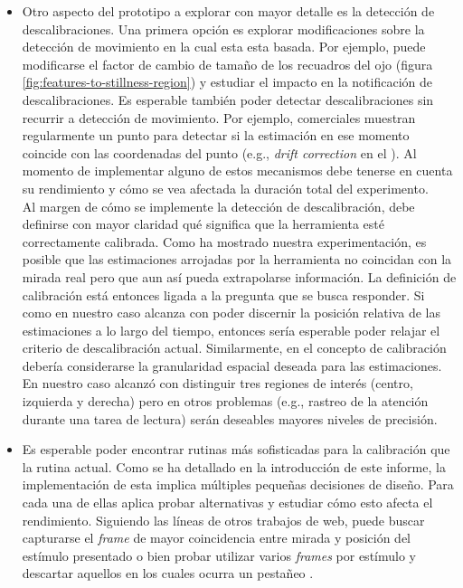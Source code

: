 \begin{itemize}
  \item
    Otro aspecto del prototipo a explorar con mayor detalle es la
    detección de descalibraciones.
    Una primera opción es explorar modificaciones sobre la detección de
    movimiento en la cual esta esta basada.
    Por ejemplo, puede modificarse el factor de cambio de tamaño de los
    recuadros del ojo (figura \ref{fig:features-to-stillness-region}) y
    estudiar el impacto en la notificación de descalibraciones.
    Es esperable también poder detectar descalibraciones sin recurrir a
    detección de movimiento.
    Por ejemplo, \eyetrackers comerciales muestran regularmente un punto para
    detectar si la estimación en ese momento coincide con las coordenadas del
    punto (e.g., \textit{drift correction} en el \eyetracker \eyelink).
    Al momento de implementar alguno de estos mecanismos debe tenerse en cuenta
    su rendimiento y cómo se vea afectada la duración total del experimento. \\
    Al margen de cómo se implemente la detección de descalibración, debe
    definirse con mayor claridad qué significa que la herramienta esté
    correctamente calibrada.
    Como ha mostrado nuestra experimentación, es posible que las estimaciones
    arrojadas por la herramienta no coincidan con la mirada real pero que aun
    así pueda extrapolarse información.
    La definición de calibración está entonces ligada a la pregunta que se
    busca responder.
    Si como en nuestro caso alcanza con poder discernir la posición relativa de
    las estimaciones a lo largo del tiempo, entonces sería esperable poder
    relajar el criterio de descalibración actual.
    Similarmente, en el concepto de calibración debería considerarse la
    granularidad espacial deseada para las estimaciones.
    En nuestro caso alcanzó con distinguir tres regiones de interés (centro,
    izquierda y derecha) pero en otros problemas (e.g., rastreo de la atención
    durante una tarea de lectura) serán deseables mayores niveles de precisión.

  \item Es esperable poder encontrar rutinas más sofisticadas para la
calibración que la rutina actual.
  Como se ha detallado en la introducción de este informe, la implementación de
esta implica múltiples pequeñas decisiones de diseño.
  Para cada una de ellas aplica probar alternativas y estudiar cómo esto afecta
el rendimiento.
  Siguiendo las líneas de otros trabajos de \eyetracking web, puede buscar
capturarse el \textit{frame} de mayor coincidencia entre mirada y posición del
estímulo presentado \cite{huang_2016_pace} o bien probar utilizar varios
\textit{frames} por estímulo y descartar aquellos en los cuales ocurra un
pestañeo \cite{xu_2015_turker_gaze}. 


\end{itemize}
